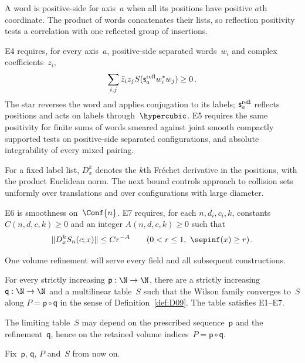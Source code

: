 A word is positive-side for axis~$a$ when all its positions have positive $a$th coordinate. The product of words concatenates their lists, so reflection positivity tests a correlation with one reflected group of insertions.
\begin{definition}\label{def:E4-E5}
E4 requires, for every axis~$a$, positive-side separated words~$w_i$ and complex coefficients~$z_i$,
\begin{equation*}
\sum_{i,j}\bar z_i z_jS(\mathsf s_a^{\rm refl}w_i^*w_j)\ge0\,.
\end{equation*}
The star reverses the word and applies conjugation to its labels; $\mathsf s_a^{\rm refl}$ reflects positions and acts on labels through~$\hypercubic$. E5 requires the same positivity for finite sums of words smeared against joint smooth compactly supported tests on positive-side separated configurations, and absolute integrability of every mixed pairing.
\end{definition}

For a fixed label list, $D_x^k$ denotes the $k$th Fr\'echet derivative in the positions, with the product Euclidean norm. The next bound controls approach to collision sets uniformly over translations and over configurations with large diameter.
\begin{definition}\label{def:E6-E7}
E6 is smoothness on~$\Conf{n}$. E7 requires, for each $n,d_i,c_i,k$, constants $C(n,d,c,k)\ge0$ and an integer $A(n,d,c,k)\ge0$ such that
\begin{equation*}
\|D_x^kS_n(c;x)\|\le Cr^{-A}
\qquad(0<r\le1,\ \sepinf(x)\ge r)\,.
\end{equation*}
\end{definition}

One volume refinement will serve every field and all subsequent constructions.
\nopagebreak
\begin{theorem}\label{prop:IV}\label{thm:IV}
For every strictly increasing $\mathsf p:\N\to\N$, there are a strictly increasing $\mathsf q:\N\to\N$ and a multilinear table~$S$ such that the Wilson family converges to~$S$ along $P=\mathsf p\circ\mathsf q$ in the sense of Definition~\ref{def:D09}. The table satisfies E1--E7.
\end{theorem}
\begin{remark}\label{rem:volume-choice}
The limiting table~$S$ may depend on the prescribed sequence~$\mathsf p$ and the refinement~$\mathsf q$, hence on the retained volume indices~$P=\mathsf p\circ\mathsf q$.
\end{remark}
Fix~$\mathsf p$, $\mathsf q$, $P$ and~$S$ from now on.

